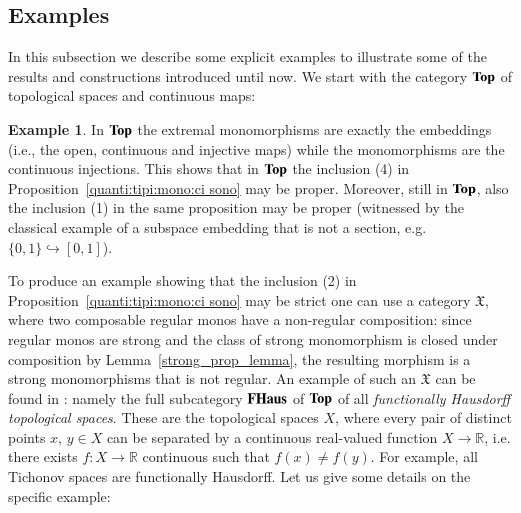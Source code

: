 \documentclass[12pt]{article}
\theoremstyle{definition}
\newtheorem{example}[lemma]{Example}
\def\R{\mathbb R}
\def\X{\mathfrak X}
\renewcommand{\Top}{\textbf{\textup{Top}}}
\newcommand{\FHaus}{\textbf{\textup{FHaus}}}
\numberwithin{equation}{section}
\begin{document}
\subsection{Examples}

In this subsection we describe some explicit examples to illustrate some of the results and constructions introduced until now. We start with the category $\Top$ of topological spaces and continuous maps:


\begin{example}\label{exa:monos1} 
 In $\Top$ the extremal monomorphisms are exactly the  embeddings (i.e., the open, continuous and injective maps) while the monomorphisms are the continuous injections. This shows that in $\Top$ the inclusion (4) in Proposition~\ref{quanti:tipi:mono:ci sono} may be proper. Moreover, still in $\Top$, also the  inclusion (1) in the same proposition may be proper (witnessed by the classical example of a subspace embedding that is not a section, e.g. $\{0,1\} \hookrightarrow [0,1]$). 
 \end{example}

To produce an example showing that the inclusion (2) in Proposition~\ref{quanti:tipi:mono:ci sono}  may be strict one can use a category $\X$, where two composable regular monos %
have a non-regular composition:%
since regular monos are strong and the class of strong monomorphism is closed under composition by Lemma~\ref{strong_prop_lemma}, the resulting morphism is a strong monomorphisms that is not regular. An example of such an $\X$ can be found in \cite[Exercise 7J(a)]{cats}: namely the full subcategory $\FHaus$ of $\Top$ of all {\em functionally Hausdorff topological spaces}. These are the topological spaces $X$, where every pair of distinct points $x,\, y \in X$ can be separated by a continuous real-valued function $X\to \R$, i.e. there exists $f:X\to \R$ continuous such that $f(x)\neq f(y)$. For example, all Tichonov spaces are functionally Hausdorff.  Let us give some details on the specific example:  
\end{document}
